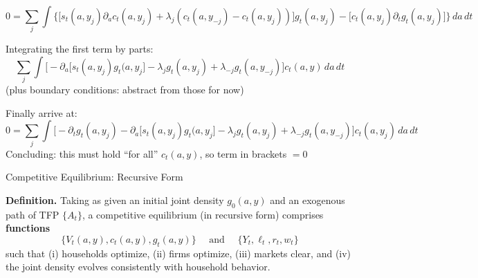 \documentclass[11pt, aspectratio=169]{beamer}
\begin{document}
\begin{frame}{}
\begin{equation*}
	0 = \sum_j \int \bigg\{
	\bigg[ s_t(a, y_j) \partial_a c_t(a, y_j) + \lambda_j (c_t(a, y_{-j}) - c_t(a, y_j)) \bigg] g_t(a, y_j)
	- \bigg[ c_t(a, y_j) \partial_t g_t(a, y_j) \bigg] \bigg\}\, da \, dt
\end{equation*}

Integrating the first term by parts:
\begin{equation*}
	\sum_j \int \bigg[- \partial_a \big[ s_t(a, y_j) g_t(a, y_j \big] - \lambda_j g_t(a, y_j) + \lambda_{-j} g_t(a, y_{-j}) \bigg] c_t(a, y) \, da \, dt
\end{equation*}
(plus boundary conditions: abstract from those for now)


\vspace{4mm}
Finally arrive at:
\begin{equation*}
	0 = 
	\sum_j \int \bigg[- \partial_t g_t(a, y_j) - \partial_a \big[ s_t(a, y_j) g_t(a, y_j \big] - \lambda_j g_t(a, y_j) + \lambda_{-j} g_t(a, y_{-j}) \bigg] c_t(a, y_j) \, da \, dt
\end{equation*}
Concluding: this must hold ``for all'' $c_t(a, y)$, so term in brackets $= 0$

\end{frame} 


\begin{frame}{Competitive Equilibrium: Recursive Form}

\textbf{Definition.} Taking as given an initial joint density $g_0(a, y)$ and an exogenous path of TFP $\{A_t\}$, a competitive equilibrium (in recursive form) comprises \textbf{functions}
\begin{equation*}
	\Big\{ V_t(a, y), c_t(a, y), g_t(a, y) \Big\} 
	\quad \text{ and } \quad
	\Big\{ Y_t, \ell_t, r_t, w_t \Big\}
\end{equation*}
such that (i) households optimize, (ii) firms optimize, (iii) markets clear, and (iv) the joint density evolves consistently with household behavior. 

\end{frame}
\end{document}
